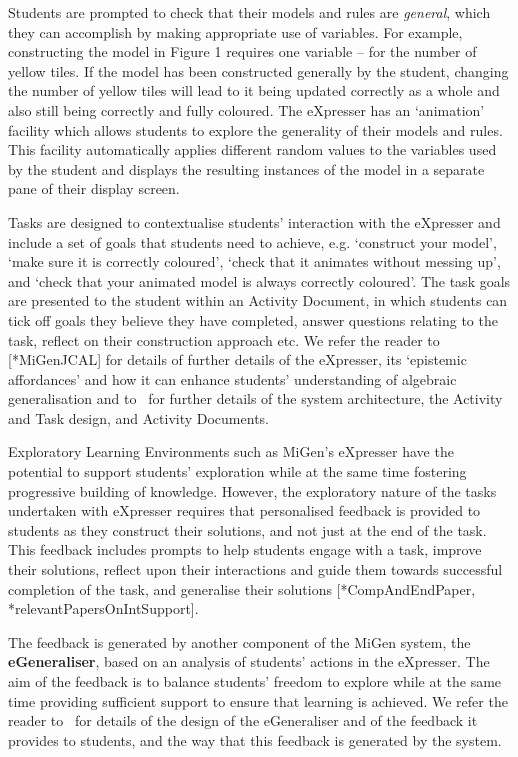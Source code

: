 Students are prompted to check that their models and rules are {\em
  general}, which they can accomplish by making appropriate use of
variables. For example, constructing the model in Figure 1 requires
one variable – for the number of yellow tiles. If the model has been
constructed generally by the student, changing the number of yellow
tiles will lead to it being updated correctly as a whole and also
still being correctly and fully coloured. The eXpresser has an
`animation' facility which allows students to explore the generality
of their models and rules. This facility automatically applies
different random values to the variables used by the student and
displays the resulting instances of the model in a separate pane of
their display screen.  

Tasks are designed to contextualise students' interaction with the
eXpresser and include a set of goals that students need to achieve,
e.g. `construct your model', `make sure it is correctly coloured',
`check that it animates without messing up', and `check that your
animated model is always correctly coloured'. The task goals are
presented to the student within an Activity Document, in which
students can tick off goals they believe they have completed, answer
questions relating to the task, reflect on their construction approach
etc. We refer the reader to [*MiGenJCAL] for details of 
further details of the eXpresser, its `epistemic
affordances' and how it can enhance
 students’ understanding of algebraic generalisation and to~\cite{CompAndEdPaper} for further details
of the system architecture, the Activity and Task design, and Activity Documents.  

Exploratory Learning Environments such as MiGen's eXpresser
have the potential to support students' exploration while at the same
time fostering progressive building of knowledge. However, the
exploratory nature of the tasks undertaken with eXpresser requires
that personalised feedback is provided to students as they construct
their solutions, and not just at the end of the task. This feedback
includes prompts to help students engage with a task, improve their
solutions, reflect upon their interactions and guide them towards
successful completion of the task, and generalise their solutions
[*CompAndEndPaper, *relevantPapersOnIntSupport]. 

The feedback is generated by another
component of the MiGen system, the {\bf eGeneraliser}, based on an
analysis of students’ actions in the eXpresser. %
%
The aim of the
feedback is to balance students' freedom to explore while at the same
time providing sufficient support to ensure that learning is
achieved. We refer the reader to~\cite{relevantPapersOnIntSupport} for
details of the design of the eGeneraliser and of the feedback it
provides to students, and the way that this feedback is generated by
the system.  

